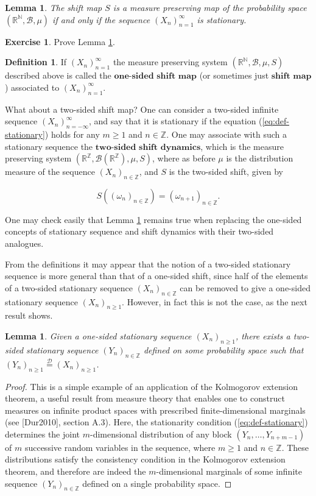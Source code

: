 \documentclass[11pt]{report}
\newcommand{\R}{\mathbb{R}}
\newcommand{\Z}{\mathbb{Z}}
\newcommand{\N}{\mathbb{N}}
\theoremstyle{plain}
\newtheorem{lem}[thm]{Lemma}
\theoremstyle{definition}
\newtheorem{defn}[thm]{Definition}
\newtheorem{xexercise}[thm]{Exercise}
\begin{document}
\begin{lem}
\label{lem-shift-stationary}
The shift map $S$ is a measure preserving map of the probability space $(\R^\N,\mathcal{B},\mu)$ if and only if the sequence $(X_n)_{n=1}^\infty$ is stationary.
\end{lem}

\begin{xexercise}
Prove Lemma \ref{lem-shift-stationary}.
\end{xexercise}

\begin{defn}
If $(X_n)_{n=1}^\infty$ the measure preserving system $(\R^\N,\mathcal{B},\mu,S)$ described above is called the $\textbf{one-sided shift map}$ (or sometimes just $\textbf{shift map}$) associated to $(X_n)_{n=1}^\infty$.
\end{defn}

What about a two-sided shift map? One can consider a two-sided infinite sequence $(X_n)_{n=-\infty}^\infty$, and say that it is stationary if the equation (\ref{eq:def-stationary}) holds for any $m\ge1$ and $n\in\Z$. One may associate with such a stationary sequence the $\textbf{two-sided shift dynamics}$, which is the measure preserving system $(\R^\Z,\mathcal{B}(\R^\Z), \mu, S)$, where as before $\mu$ is the distribution measure of the sequence $(X_n)_{n\in\Z}$, and $S$ is the two-sided shift, given by

\[
S((\omega_n)_{n\in\Z}) = (\omega_{n+1})_{n\in\Z}.
\]

One may check easily that Lemma \ref{lem-shift-stationary} remains true when replacing the one-sided concepts of stationary sequence and shift dynamics with their two-sided analogues.

From the definitions it may appear that the notion of a two-sided stationary sequence is more general than that of a one-sided shift, since half of the elements of a two-sided stationary sequence $(X_n)_{n\in\Z}$ can be removed to give a one-sided stationary sequence $(X_n)_{n\ge 1}$. However, in fact this is not the case, as the next result shows.

\begin{lem}
Given a one-sided stationary sequence $(X_n)_{n\ge 1}$, there exists a two-sided stationary sequence $(Y_n)_{n\in\Z}$ defined on some probability space such that $(Y_n)_{n\ge1} \stackrel{\mathcal{D}}{=} (X_n)_{n\ge1}$.
\end{lem}

\begin{proof}
This is a simple example of an application of the Kolmogorov extension theorem, a useful result from measure theory that enables one to construct measures on infinite product spaces with prescribed finite-dimensional marginals (see [Dur2010], section A.3). Here, the stationarity condition (\ref{eq:def-stationary}) determines the joint $m$-dimensional distribution of any block $(Y_n,\ldots,Y_{n+m-1})$ of $m$ successive random variables in the sequence, where $m\ge1$ and $n\in\Z$. These distributions satisfy the consistency condition in the Kolmogorov extension theorem, and therefore are indeed the $m$-dimensional marginals of some infinite sequence $(Y_n)_{n\in\Z}$ defined on a single probability space.
\end{proof}
\end{document}
